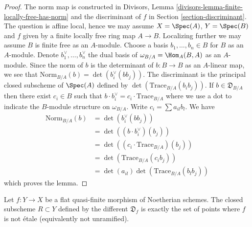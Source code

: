 \begin{proof}
The norm map is constructed in
Divisors, Lemma \ref{divisors-lemma-finite-locally-free-has-norm}
and the discriminant of $f$ in Section \ref{section-discriminant}.
The question is affine local, hence we may assume $X = \Spec(A)$,
$Y = \Spec(B)$ and $f$ given by a finite locally free ring map $A \to B$.
Localizing further we may assume $B$ is finite free as an $A$-module.
Choose a basis $b_1, \ldots, b_n \in B$ for $B$ as an $A$-module.
Denote $b_1^\vee, \ldots, b_n^\vee$ the dual basis of
$\omega_{B/A} = \Hom_A(B, A)$ as an $A$-module.
Since the norm of $b$ is the determinant of $b : B \to B$ as an
$A$-linear map, we see that
$\text{Norm}_{B/A}(b) = \det(b_i^\vee(bb_j))$.
The discriminant is the principal closed subscheme of $\Spec(A)$
defined by $\det(\text{Trace}_{B/A}(b_ib_j))$.
If $b \in \mathfrak{D}_{B/A}$ then
there exist $c_i \in B$ such that
$b \cdot b_i^\vee = c_i \cdot \text{Trace}_{B/A}$ where
we use a dot to indicate the $B$-module structure on $\omega_{B/A}$.
Write $c_i = \sum a_{il} b_l$.
We have
\begin{align*}
\text{Norm}_{B/A}(b)
& =
\det(b_i^\vee(bb_j)) \\
& =
\det( (b \cdot b_i^\vee)(b_j)) \\
& =
\det((c_i \cdot \text{Trace}_{B/A})(b_j)) \\
& =
\det(\text{Trace}_{B/A}(c_ib_j)) \\
& =
\det(a_{il}) \det(\text{Trace}_{B/A}(b_l b_j))
\end{align*}
which proves the lemma.
\end{proof}

\begin{lemma}
\label{lemma-different-ramification}
Let $f : Y \to X$ be a flat quasi-finite morphism of Noetherian schemes.
The closed subscheme $R \subset Y$ defined by the different $\mathfrak{D}_f$
is exactly the set of points where $f$ is not \'etale
(equivalently not unramified).
\end{lemma}

